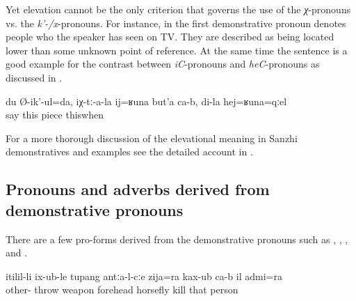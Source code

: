 Yet elevation cannot be the only criterion that governs the use of the \textit{χ}-pronouns vs. the \textit{k'-/x}-pronouns. For instance, in  the first demonstrative pronoun denotes people who the speaker has seen on TV. They are described as being located lower than some unknown point of reference. At the same time the sentence is a good example for the contrast between \textit{iC}-pronouns and \textit{heC}-pronouns as discussed in . 

\begin{exe}
	\ex	\label{I (masc.) say, they have a (little) piece (of a diamond) like this, while I have one like this}
	\gll	du	Ø-ik'-ul=da,	iχ-tː-a-la	ij=ʁuna	but'a	ca-b,	di-la	hej=ʁuna=qːel \\
			say		this	piece			thiswhen\\
	\glt	{}
\end{exe}

For a more thorough discussion of the elevational meaning in Sanzhi demonstratives and examples see the detailed account in \citet{ForkerLTSanzhi}.

\subsection{Pronouns and adverbs derived from demonstrative pronouns}
\label{ssec:Pronouns and adverbs derived from demonstrative pronouns}

There are a few pro-forms derived from the demonstrative pronouns such as  ,   ,  , and  .
%
\begin{exe}
	 \label{ex:thehorseflyandtheman}
	\sn
	\gll	itilil-li	ix-ub-le	tupang	antːa-l-cːe	zija=ra	kax-ub	ca-b	il	admi=ra\\
		other-	throw	weapon	forehead horsefly	kill		that	person\\
	\glt	{}
\end{exe}

